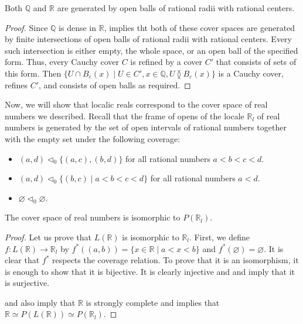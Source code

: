 \documentclass[reqno]{amsart}
\theoremstyle{definition}
\theoremstyle{remark}
\numberwithin{figure}{section}
\newcommand{\overlap}[2]{#1 \between #2}
\begin{document}
\begin{lem}
Both $\mathbb{Q}$ and $\mathbb{R}$ are generated by open balls of rational radii with rational centers.
\end{lem}
\begin{proof}
Since $\mathbb{Q}$ is dense in $\mathbb{R}$,  implies tht both of these cover spaces are generated by finite intersections of open balls of rational radii with rational centers.
Every such intersection is either empty, the whole space, or an open ball of the specified form.
Thus, every Cauchy cover $C$ is refined by a cover $C'$ that consists of sets of this form.
Then $\{ U \cap B_\varepsilon(x) \mid U \in C', x \in \mathbb{Q}, \overlap{U}{B_\varepsilon(x)} \}$ is a Cauchy cover, refines $C'$, and consists of open balls as required.
\end{proof}

Now, we will show that localic reals correspond to the cover space of real numbers we described.
Recall that the frame of opens of the locale $\mathbb{R}_l$ of real numbers is generated by the set of open intervals of rational numbers together with the empty set under the following coverage:
\begin{itemize}
\item $(a,d) \triangleleft_0 \{ (a,c), (b,d) \}$ for all rational numbers $a < b < c < d$.
\item $(a,d) \triangleleft_0 \{ (b,c) \mid a < b < c < d \}$ for all rational numbers $a < d$.
\item $\varnothing \triangleleft_0 \varnothing$.
\end{itemize}

\begin{prop}
The cover space of real numbers is isomorphic to $P(\mathbb{R}_l)$.
\end{prop}
\begin{proof}
Let us prove that $L(\mathbb{R})$ is isomorphic to $\mathbb{R}_l$.
First, we define $f : L(\mathbb{R}) \to \mathbb{R}_l$ by $f^*((a,b)) = \{ x \in \mathbb{R} \mid a < x < b \}$ and $f^*(\varnothing) = \varnothing$.
It is clear that $f^*$ respects the coverage relation.
To prove that it is an isomorphism, it is enough to show that it is bijective.
It is clearly injective and  and  imply that it is surjective.

 and  also imply that $\mathbb{R}$ is strongly complete and  implies that $\mathbb{R} \simeq P(L(\mathbb{R})) \simeq P(\mathbb{R}_l)$.
\end{proof}
\end{document}
